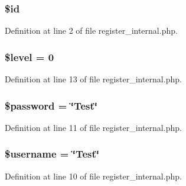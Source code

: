 \subsubsection[{\texorpdfstring{\$id}{$id}}]{\setlength{\rightskip}{0pt plus 5cm}\$id}\hypertarget{register__internal_8php_ae97941710d863131c700f069b109991e}{}\label{register__internal_8php_ae97941710d863131c700f069b109991e}


Definition at line 2 of file register\+\_\+internal.\+php.

\subsubsection[{\texorpdfstring{\$level}{$level}}]{\setlength{\rightskip}{0pt plus 5cm}\$level = 0}\hypertarget{register__internal_8php_abd32cc82c6a3f79491987de36ad580ca}{}\label{register__internal_8php_abd32cc82c6a3f79491987de36ad580ca}


Definition at line 13 of file register\+\_\+internal.\+php.

\subsubsection[{\texorpdfstring{\$password}{$password}}]{\setlength{\rightskip}{0pt plus 5cm}\$password = \char`\"{}Test\char`\"{}}\hypertarget{register__internal_8php_a607686ef9f99ea7c42f4f3dd3dbb2b0d}{}\label{register__internal_8php_a607686ef9f99ea7c42f4f3dd3dbb2b0d}


Definition at line 11 of file register\+\_\+internal.\+php.

\subsubsection[{\texorpdfstring{\$username}{$username}}]{\setlength{\rightskip}{0pt plus 5cm}\$username = \char`\"{}Test\char`\"{}}\hypertarget{register__internal_8php_a0eb82aa5f81cf845de4b36cd653c42cf}{}\label{register__internal_8php_a0eb82aa5f81cf845de4b36cd653c42cf}


Definition at line 10 of file register\+\_\+internal.\+php.

